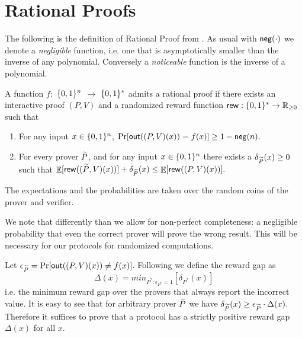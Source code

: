 \section{Rational Proofs}

The following is the definition of Rational Proof from \cite{am}. As usual with $\mathsf{neg}(\cdot)$ we denote a {\em negligible} function, i.e. one that is asymptotically smaller than the inverse of any polynomial. Conversely a {\em noticeable} function is the inverse of a polynomial. 


\noindent
\begin{definition}
\label{def:RP-delta}
\label{def:RP}
A function $f:$ $\{0, 1\}^n$ $\to$ $\{0, 1\}^*$ admits a rational proof if there exists an interactive proof $(P,V)$ and a randomized reward function
$\mathsf{rew} : \{0, 1\}^{*} \to \mathbb{R}_{\geq 0}$ such that

\begin{enumerate}
\item \label{item:completeness} For any input $x \in 
\{0, 1\}^n$, $\Pr[\mathsf{out}((P,V)(x)) = f(x)] \geq 1 - \mathsf{neg}(n).$

\item For every prover $\widetilde{P}$, and for any input $x \in 
\{0, 1\}^n$ there exists a $\delta_{\widetilde{P}}(x) \geq 0$ such that 
$ \mathop{\mathbb{E}}[\mathsf{rew}((\widetilde{P},V)(x))] + \delta_{\widetilde{P}}(x) \leq \mathop{\mathbb{E}}[\mathsf{rew}((P,V)(x))]. $
\end{enumerate}
The expectations and the probabilities are taken over the random coins of the prover and verifier.
\end{definition} 
We note that differently than \cite{am} we allow for non-perfect completeness: a negligible probability that even the correct prover will prove the wrong result. This will be necessary for our protocols for randomized computations. 


\medskip
\noindent
Let $\epsilon_{\widetilde{P}} = \Pr[\mathsf{out}((P,V)(x)) \neq f(x)]$. 
Following \cite{ratargs} we define the {\sf reward gap} as 
\[ \Delta(x) = min_{P^* : \epsilon_{P^*}=1}[\delta_{P^*}(x)]  \]
i.e. the minimum reward gap over the provers that always report the incorrect value. 
It is easy to see that for arbitrary prover $\widetilde{P}$ we have $\delta_{\widetilde{P}}(x) \geq 
\epsilon_{\widetilde{P}} \cdot \Delta(x)$. Therefore it suffices to prove that a protocol has 
a strictly positive reward gap $\Delta(x)$ for all $x$. 

